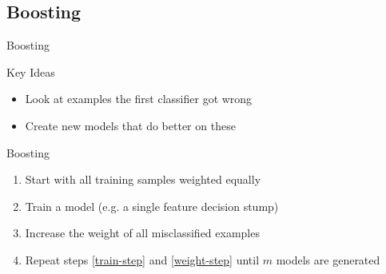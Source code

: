 \documentclass[14pt]{beamer}
\begin{document}
\subsection{Boosting}
\begin{frame}[<+->]{Boosting}
	\begin{block}{Key Ideas}
		\begin{itemize}
			\item Look at examples the first classifier got wrong
			\item Create new models that do better on these
		\end{itemize}
	\end{block}
	\begin{block}{Boosting}
		\begin{enumerate}
			\item Start with all training samples weighted equally
			\item\label{train-step} Train a model (e.g. a single feature \alert{decision stump})
			\item\label{weight-step} Increase the weight of all misclassified examples
			\item Repeat steps \ref{train-step} and \ref{weight-step} until $m$ models are generated
		\end{enumerate}
	\end{block}
\end{frame}
\end{document}

